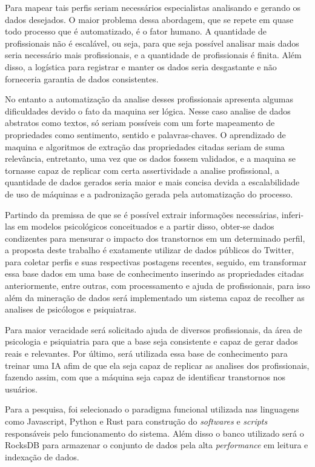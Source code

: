 Para mapear tais perfis seriam necessários especialistas analisando e gerando os dados desejados. O maior problema dessa abordagem, que se repete em quase todo processo que é automatizado, é o fator humano. A quantidade de profissionais não é escalável, ou seja, para que seja possível analisar mais dados seria necessário mais profissionais, e a quantidade de profissionais é finita. Além disso, a logística para registrar e manter os dados seria desgastante e não forneceria garantia de dados consistentes.

No entanto a automatização da analise desses profissionais apresenta algumas dificuldades devido o fato da maquina ser lógica. Nesse caso analise de dados abstratos como textos, só seriam possíveis com um forte mapeamento de propriedades como sentimento, sentido e palavras-chaves. O aprendizado de maquina e algoritmos de extração das propriedades citadas seriam de suma relevância, entretanto, uma vez que os dados fossem validados, e a maquina se tornasse capaz de replicar com certa assertividade a analise profissional, a quantidade de dados gerados seria maior e mais concisa devida a escalabilidade de uso de máquinas e a padronização gerada pela automatização do processo.

Partindo da premissa de que se é possível extrair informações necessárias, inferi-las em modelos psicológicos conceituados e a partir disso, obter-se dados condizentes para mensurar o impacto dos transtornos em um determinado perfil, a proposta deste trabalho é exatamente utilizar de dados públicos do Twitter, para coletar perfis e suas respectivas postagens recentes, seguido, em transformar essa base dados em uma base de conhecimento inserindo as propriedades citadas anteriormente, entre outras, com processamento e ajuda de profissionais, para isso além da mineração de dados será implementado um sistema capaz de recolher as analises de psicólogos e psiquiatras.

Para maior veracidade será solicitado ajuda de diversos profissionais, da área de psicologia e psiquiatria para que a base seja consistente e capaz de gerar dados reais e relevantes. Por último, será utilizada essa base de conhecimento para treinar uma IA afim de que ela seja capaz de replicar as analises dos profissionais, fazendo assim, com que a máquina seja capaz de identificar transtornos nos usuários.

Para a pesquisa, foi selecionado o paradigma funcional utilizada nas linguagens como Javascript, Python e Rust para construção do \textit{softwares} e \textit{scripts} responsáveis pelo funcionamento do sistema. Além disso o banco utilizado será o RocksDB para armazenar o conjunto de dados pela alta \textit{performance} em leitura e indexação de dados.


